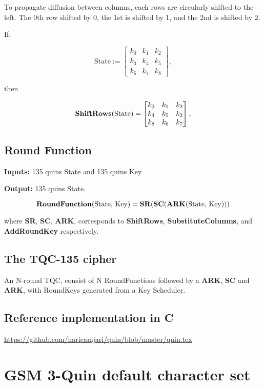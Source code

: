 \documentclass{article}
\begin{document}
\medskip

To propagate diffusion between columns, each rows are circularly
shifted to the left. The 0th row shifted by 0, the 1st is shifted by 1,
and the 2nd is shifted by 2.

If:

\[
\textrm{State} := 
\begin{bmatrix}
k_0 & k_1 & k_2 \\
k_3 & k_4 & k_5 \\
k_6 & k_7 & k_8
\end{bmatrix},
\]

then

\[
\textrm{\textbf{ShiftRows}(State)} =
\begin{bmatrix}
k_0 & k_1 & k_2 \\
k_4 & k_5 & k_3 \\
k_8 & k_6 & k_7
\end{bmatrix},
\]

\subsection{Round Function}

\textbf{Inputs:} 135 quins State and 135 quins Key

\noindent \textbf{Output:} 135 quins State.

\[
  \textrm{\textbf{RoundFunction}(State, Key)} = \textrm{\textbf{SR}(\textbf{SC}(\textbf{ARK}(State, Key)))}
\]

where \textbf{SR}, \textbf{SC}, \textbf{ARK}, corresponds to \textbf{ShiftRows}, \textbf{SubstituteColumns}, and \textbf{AddRoundKey} respectively.

\subsection{The TQC-135 cipher}

An N-round TQC, consist of N RoundFunctions followed by a \textbf{ARK}, \textbf{SC} and \textbf{ARK},
with RoundKeys generated from a Key Scheduler.

\subsection{Reference implementation in C}

\url{https://github.com/harieamjari/quin/blob/master/quin.tex}

\appendix

\section{GSM 3-Quin default character set}
\end{document}
